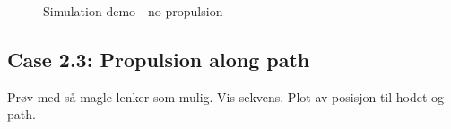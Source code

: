 \begin{figure}
    \hfil
    
    \caption{Simulation demo - no propulsion}
    \label{fig:case2-2}
\end{figure}


\subsection{Case 2.3: Propulsion along path}\label{subseq:case23}
Prøv med så magle lenker som mulig.
Vis sekvens. Plot av posisjon til hodet og path.

